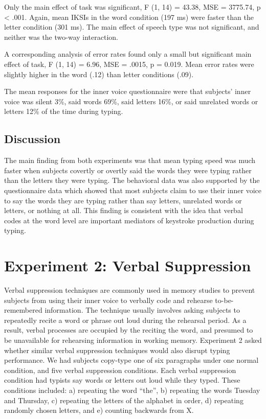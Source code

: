 \documentclass[floatsintext,man]{apa6}
\theoremstyle{definition}
\theoremstyle{definition}
\theoremstyle{definition}
\theoremstyle{remark}
\begin{document}
Only the main effect of task was significant, F (1, 14) = 43.38, MSE =
3775.74, p \textless{} .001. Again, mean IKSIs in the word condition
(197 ms) were faster than the letter condition (301 ms). The main effect
of speech type was not significant, and neither was the two-way
interaction.

A corresponding analysis of error rates found only a small but
significant main effect of task, F (1, 14) = 6.96, MSE = .0015, p =
0.019. Mean error rates were slightly higher in the word (.12) than
letter conditions (.09).

The mean responses for the inner voice questionnaire were that subjects'
inner voice was silent 3\%, said words 69\%, said letters 16\%, or said
unrelated words or letters 12\% of the time during typing.

\subsection{Discussion}\label{discussion}

The main finding from both experiments was that mean typing speed was
much faster when subjects covertly or overtly said the words they were
typing rather than the letters they were typing. The behavioral data was
also supported by the questionnaire data which showed that most subjects
claim to use their inner voice to say the words they are typing rather
than say letters, unrelated words or letters, or nothing at all. This
finding is consistent with the idea that verbal codes at the word level
are important mediators of keystroke production during typing.

\section{Experiment 2: Verbal
Suppression}\label{experiment-2-verbal-suppression}

Verbal suppression techniques are commonly used in memory studies to
prevent subjects from using their inner voice to verbally code and
rehearse to-be-remembered information. The technique usually involves
asking subjects to repeatedly recite a word or phrase out loud during
the rehearsal period. As a result, verbal processes are occupied by the
reciting the word, and presumed to be unavailable for rehearsing
information in working memory. Experiment 2 asked whether similar verbal
suppression techniques would also disrupt typing performance. We had
subjects copy-type one of six paragraphs under one normal condition, and
five verbal suppression conditions. Each verbal suppression condition
had typists say words or letters out loud while they typed. These
conditions included: a) repeating the word \enquote{the}, b) repeating
the words Tuesday and Thursday, c) repeating the letters of the alphabet
in order, d) repeating randomly chosen letters, and e) counting
backwards from X.
\end{document}
